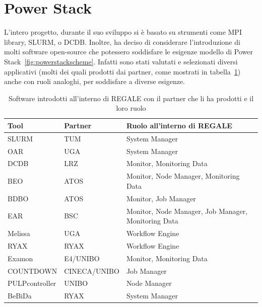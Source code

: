 \section{Power Stack}
L'intero progetto, durante il suo sviluppo si è basato su strumenti come MPI library\cite{mpi}, SLURM\cite{slurm}, o DCDB\cite{dcdb}. Inoltre, ha deciso di considerare l'introduzione di molti software open-source che potessero soddisfare le esigenze modello di Power Stack~\ref{fig:powerstackscheme}. Infatti sono stati valutati e selezionati diversi applicativi (molti dei quali prodotti dai partner, come mostrati in tabella~\ref{table:REGALE}) anche con ruoli analoghi, per soddisfare a diverse esigenze.
\begin{table}[ht]
    \centering
    \begin{tabular}{l|l|l}
    \hline
    \textbf{Tool} & \textbf{Partner} & \textbf{Ruolo all'interno di REGALE} \\
    \hline
    SLURM & TUM & System Manager \\
    \hline
    OAR & UGA & System Manager \\
    \hline
    DCDB & LRZ & Monitor, Monitoring Data \\
    \hline
    BEO & ATOS & Monitor, Node Manager, Monitoring Data \\
    \hline
    BDBO & ATOS & Monitor, Job Manager \\
    \hline
    EAR & BSC & Monitor, Node Manager, Job Manager, Monitoring Data \\
    \hline
    Melissa & UGA & Workflow Engine \\
    \hline
    RYAX & RYAX & Workflow Engine \\
    \hline
    Examon & E4/UNIBO & Monitor, Monitoring Data \\
    \hline
    COUNTDOWN & CINECA/UNIBO & Job Manager \\
    \hline
    PULPcontroller & UNIBO & Node Manager \\
    \hline
    BeBiDa & RYAX & System Manager \\
    \hline
\end{tabular}
\caption{Software introdotti all'interno di REGALE con il partner che li ha prodotti e il loro ruolo}\label{table:REGALE}
\end{table}

